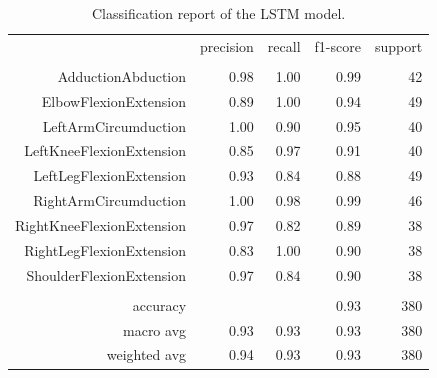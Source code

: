\begin{table}[h!]
	\centering
	\caption{Classification report of the LSTM model.}
	\label{tab:LSTMreport}
	\begin{tabular}{rrrrr}
		\multicolumn{1}{l}{}      & precision            & recall               & f1-score             & support              \\
		\multicolumn{1}{l}{}      &                      &                      &                      &                      \\
		AdductionAbduction        & 0.98                 & 1.00                 & 0.99                 & 42                   \\
		ElbowFlexionExtension     & 0.89                 & 1.00                 & 0.94                 & 49                   \\
		LeftArmCircumduction      & 1.00                 & 0.90                 & 0.95                 & 40                   \\
		LeftKneeFlexionExtension  & 0.85                 & 0.97                 & 0.91                 & 40                   \\
		LeftLegFlexionExtension   & 0.93                 & 0.84                 & 0.88                 & 49                   \\
		RightArmCircumduction     & 1.00                 & 0.98                 & 0.99                 & 46                   \\
		RightKneeFlexionExtension & 0.97                 & 0.82                 & 0.89                 & 38                   \\
		RightLegFlexionExtension  & 0.83                 & 1.00                 & 0.90                 & 38                   \\
		ShoulderFlexionExtension  & 0.97                 & 0.84                 & 0.90                 & 38                   \\
		\multicolumn{1}{l}{}      & \multicolumn{1}{l}{} & \multicolumn{1}{l}{} & \multicolumn{1}{l}{} & \multicolumn{1}{l}{} \\
		accuracy                  &                      &                      & 0.93                 & 380                  \\
		macro avg                 & 0.93                 & 0.93                 & 0.93                 & 380                  \\
		weighted avg              & 0.94                 & 0.93                 & 0.93                 & 380
	\end{tabular}%
\end{table}

